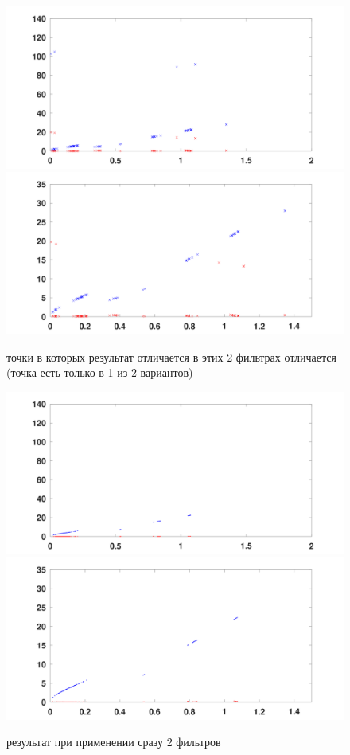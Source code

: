 \documentclass{article}
\begin{document}
	\begin{figure}[!h]
		\begin{center}
			\includegraphics[width=0.5\linewidth]{images/matrix_pencil_method/dx_L_filter_diff.png}\includegraphics[width=0.5\linewidth]{images/matrix_pencil_method/dx_L_filter_diff_near.png}
			\caption{точки в которых результат отличается в этих 2 фильтрах отличается (точка есть только в 1 из 2 вариантов)}
		\end{center}
	\end{figure}
	
	\begin{figure}[!h]
		\begin{center}
			\includegraphics[width=0.5\linewidth]{images/matrix_pencil_method/dx_L_filter.png}\includegraphics[width=0.5\linewidth]{images/matrix_pencil_method/dx_L_filter_near.png}
			\caption{результат при применении сразу 2 фильтров}
		\end{center}
	\end{figure}
	
\end{document}
